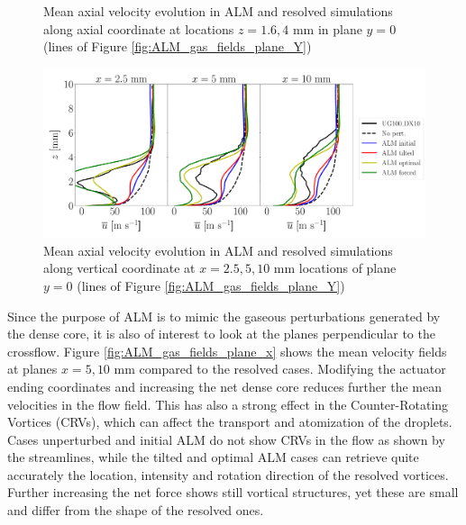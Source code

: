 \begin{figure}[ht]
\begin{subfigure}[b]{0.45\textwidth}
\end{subfigure}
\vspace*{-0.15in}
\caption{Mean axial velocity evolution in ALM and resolved simulations along axial coordinate at locations $z = 1.6, 4$ mm in plane $y = 0$ (lines of Figure \ref{fig:ALM_gas_fields_plane_Y})}
\label{fig:JICF_ICS_ALM_lines_y0_along_x_ux_mean}
\end{figure}




\begin{figure}[ht]
\centering
   \includegraphics[scale=0.26]{./part2_developments/figures_ch6_lagrangian_JICF/gas_field_initial_conditions/ALM_lines_y0_along_z_ux_mean}
   \vspace*{-0.2in}
\caption{Mean axial velocity evolution in ALM and resolved simulations along vertical coordinate at $x = 2.5, 5, 10$ mm locations of plane $y = 0$ (lines of Figure \ref{fig:ALM_gas_fields_plane_Y})}
\label{fig:JICF_ICS_ALM_lines_y0_along_z_ux_mean}
\end{figure}


Since the purpose of ALM is to mimic the gaseous perturbations generated by the dense core, it is also of interest to look at the planes perpendicular to the crossflow. Figure \ref{fig:ALM_gas_fields_plane_x} shows the mean velocity fields at planes $x = 5, 10$ mm compared to the resolved cases. Modifying the actuator ending coordinates and increasing the net dense core reduces further the mean velocities in the flow field. This has also a strong effect in the Counter-Rotating Vortices (CRVs), which can affect the transport and atomization of the droplets. Cases unperturbed and initial ALM do not show CRVs in the flow as shown by the streamlines, while the tilted and optimal ALM cases can retrieve quite accurately the location, intensity and rotation direction of the resolved vortices. Further increasing the net force shows still vortical structures, yet these are small and differ from the shape of the resolved ones. %

